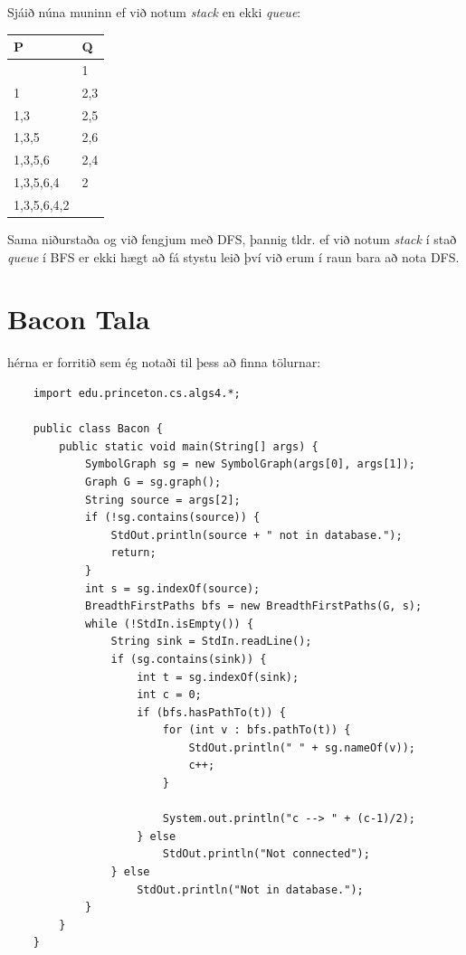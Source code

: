 \documentclass{article}
\begin{document}
Sjáið núna muninn ef við notum \emph{stack} en ekki \emph{queue}:
\begin{center}
    \begin{tabular}{|l|l|}
        \hline
        P&Q\\
        \hline
        &1\\
        \hline
        1&2,3\\
        \hline
        1,3&2,5\\
        \hline
        1,3,5&2,6\\
        \hline
        1,3,5,6&2,4\\
        \hline
        1,3,5,6,4&2\\
        \hline
        1,3,5,6,4,2&\\
        \hline
    \end{tabular}
\end{center}
Sama niðurstaða og við fengjum með DFS, þannig tldr. ef við notum \emph{stack} í stað \emph{queue} í BFS er ekki hægt að fá stystu leið því við erum í raun bara að nota DFS.

\section*{Bacon Tala}
hérna er forritið sem ég notaði til þess að finna tölurnar:

\begin{lstlisting}
    import edu.princeton.cs.algs4.*;

    public class Bacon {
        public static void main(String[] args) {
            SymbolGraph sg = new SymbolGraph(args[0], args[1]);
            Graph G = sg.graph();
            String source = args[2];
            if (!sg.contains(source)) {
                StdOut.println(source + " not in database.");
                return;
            }
            int s = sg.indexOf(source);
            BreadthFirstPaths bfs = new BreadthFirstPaths(G, s);
            while (!StdIn.isEmpty()) {
                String sink = StdIn.readLine();
                if (sg.contains(sink)) {
                    int t = sg.indexOf(sink);
                    int c = 0;
                    if (bfs.hasPathTo(t)) {
                        for (int v : bfs.pathTo(t)) {
                            StdOut.println(" " + sg.nameOf(v));
                            c++;
                        }
    
                        System.out.println("c --> " + (c-1)/2);
                    } else
                        StdOut.println("Not connected");
                } else
                    StdOut.println("Not in database.");
            }
        }
    }
    
\end{lstlisting}
\end{document}
